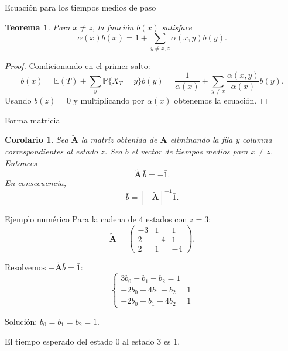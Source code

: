 \documentclass[aspectratio=169]{beamer}
\theoremstyle{plain}
\newtheorem{teorema}{Teorema}
\newtheorem{corolario}{Corolario}
\theoremstyle{definition}
\newcommand{\A}{\mathbf{A}}
\newcommand{\E}{\mathbb{E}}
\newcommand{\Prob}{\mathbb{P}}
\newcommand{\1}{\mathbf{1}}
\begin{document}
\begin{frame}{Ecuación para los tiempos medios de paso}
  \begin{teorema}
    Para $x \neq z$, la función $b(x)$ satisface
    \[ \alpha(x)b(x) = 1 + \sum_{y \neq x, z} \alpha(x,y) b(y). \]
  \end{teorema}
  
  \begin{proof}
    Condicionando en el primer salto:
    \[ b(x) = \E(T) + \sum_y \Prob\{X_T=y\} b(y) = \frac{1}{\alpha(x)} + \sum_{y\neq x} \frac{\alpha(x,y)}{\alpha(x)} b(y). \]
    Usando $b(z)=0$ y multiplicando por $\alpha(x)$ obtenemos la ecuación.
  \end{proof}
\end{frame}

\begin{frame}{Forma matricial}
  \begin{corolario}
    Sea $\tilde{\A}$ la matriz obtenida de $\A$ eliminando la fila y columna correspondientes al estado $z$.
    Sea $\bar{b}$ el vector de tiempos medios para $x \neq z$. Entonces
    \[
      \tilde{\A}\,\bar{b} = -\bar{1}.
    \]
    En consecuencia,
    \[
      \bar{b} = [-\tilde{\A}]^{-1}\bar{1}.
    \]
  \end{corolario}

  \vspace{0.2cm}
  \begin{center}
  \end{center}
\end{frame}

\begin{frame}[t]{Ejemplo numérico}
  Para la cadena de 4 estados con $z=3$:
  \[ \tilde{\A} = \begin{pmatrix}
    -3 & 1 & 1 \\
    2 & -4 & 1 \\
    2 & 1 & -4
  \end{pmatrix}. \]
  
  Resolvemos $-\tilde{\A}\bar{b} = \bar{1}$:
  \[ \begin{cases}
    3b_0 - b_1 - b_2 = 1 \\
    -2b_0 + 4b_1 - b_2 = 1 \\
    -2b_0 - b_1 + 4b_2 = 1
  \end{cases} \]
  
  Solución: $b_0 = b_1 = b_2 = 1$.
  
  \vspace{0.3cm}
  
  El tiempo esperado del estado 0 al estado 3 es 1.
\end{frame}
\end{document}
